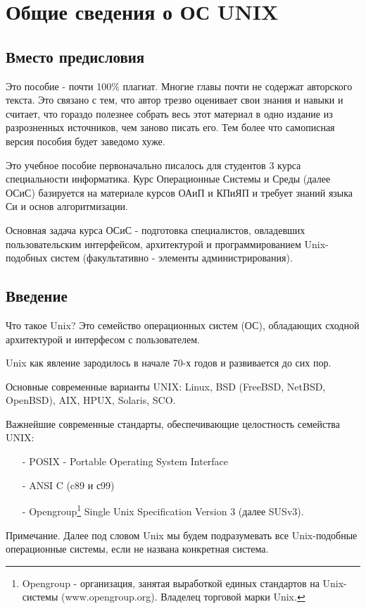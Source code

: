 \chapter{Общие сведения о ОС UNIX}

\section{Вместо предисловия}

Это пособие - почти 100\% плагиат. Многие главы почти не содержат авторского текста. Это связано с тем, что автор трезво оценивает свои знания и навыки и считает, что гораздо полезнее собрать весь этот материал в одно издание из разрозненных источников, чем заново писать его. Тем более что самописная версия пособия будет заведомо хуже.

Это учебное пособие первоначально писалось для студентов 3 курса специальности информатика. Курс Операционные Системы и Среды (далее ОСиС) базируется на материале курсов ОАиП и КПиЯП и требует знаний языка Си и основ алгоритмизации.

Основная задача курса ОСиС - подготовка специалистов, овладевших пользовательским интерфейсом, архитектурой и программированием Unix-подобных систем (факультативно - элементы администрирования). 

  
\section{Введение}

Что такое Unix? Это семейство операционных систем (ОС), обладающих сходной архитектурой и интерфесом с пользователем. 

Unix как явление зародилось в начале 70-х годов и развивается до сих пор.

Основные современные варианты UNIX: Linux, BSD (FreeBSD, NetBSD, OpenBSD), AIX, HPUX, Solaris, SCO. 

Важнейшие современные стандарты, обеспечивающие целостность семейства UNIX:
\begin{itemize}
\item [-] POSIX - Portable Operating System Interface
\item [-] ANSI C (c89 и с99) 
\item [-] Opengroup\footnote{Opengroup - организация, занятая выработкой единых стандартов на Unix-системы (www.opengroup.org). Владелец торговой марки Unix.} Single Unix Specification Version 3 (далее SUSv3). 
\end{itemize}
Примечание. Далее под словом Unix мы будем подразумевать все Unix-подобные операционные системы, если не названа конкретная система.

